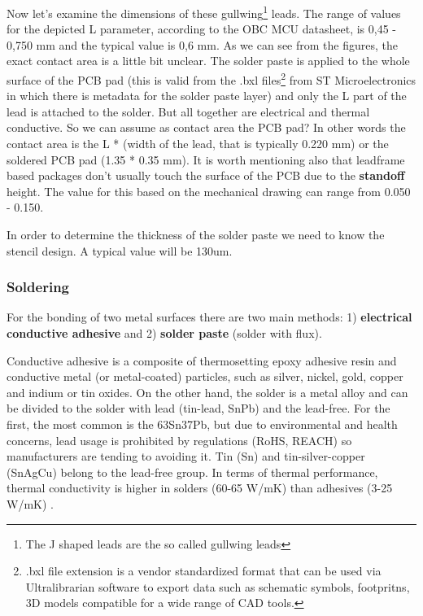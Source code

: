 \documentclass[final]{cubedoc}
\begin{document}
	
	
	Now let's examine the dimensions of these gullwing\footnote{The J shaped leads are the so called gullwing leads} leads. The range of values for the depicted L parameter, according to the OBC MCU datasheet, is 0,45 - 0,750 mm and the typical value is 0,6 mm. As we can see from the figures, the exact contact area is a little bit unclear. The solder paste is applied to the whole surface of the PCB pad (this is valid from the .bxl files\footnote{.bxl file extension is a vendor standardized format that can be used via Ultralibrarian software to export data such as schematic symbols, footpritns, 3D models compatible for a wide range of CAD tools.} from ST Microelectronics in which there is metadata for the solder paste layer) and only the L part of the lead is attached to the solder. But all together are electrical and thermal conductive. So we can assume as contact area the PCB pad? In other words the contact area is the L * (width of the lead, that is typically 0.220 mm) or the soldered PCB pad (1.35 * 0.35 mm). It is worth mentioning also that leadframe based packages don't usually touch the surface of the PCB due to the \textbf{standoff} height. The value for this based on the mechanical drawing can range from 0.050 - 0.150.
	
	In order to determine the thickness of the solder paste we need to know the stencil design. A typical value will be 130um.
	
	
	\subsubsection{Soldering}
	
	
	For the bonding of two metal surfaces there are two main methods: 1) \textbf{electrical conductive adhesive} and 2) \textbf{solder paste} (solder with flux). 
	
	
	Conductive adhesive is a composite of thermosetting epoxy adhesive resin and conductive metal (or metal-coated) particles, such as silver, nickel, gold, copper and indium or tin oxides. On the other hand, the solder is a metal alloy and can be divided to the solder with lead (tin-lead, SnPb) and the lead-free. For the first, the most common is the 63Sn37Pb, but due to environmental and health concerns, lead usage is prohibited by regulations (RoHS, REACH) so manufacturers are tending to avoiding it. Tin (Sn) and tin-silver-copper (SnAgCu) belong to the lead-free group. In terms of thermal performance, thermal conductivity is higher in solders (60-65 W/mK) than adhesives (3-25 W/mK) \cite{leadvssolde}. 
	
\end{document}
